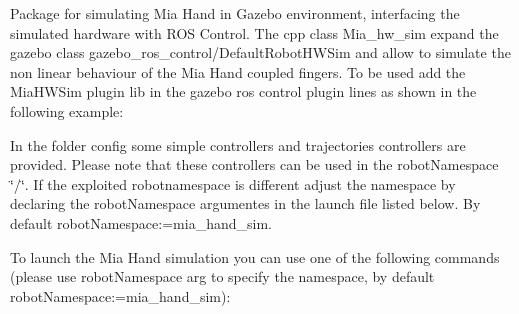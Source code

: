 Package for simulating Mia Hand in Gazebo environment, interfacing the simulated hardware with R\+OS Control. The cpp class Mia\+\_\+hw\+\_\+sim expand the gazebo class gazebo\+\_\+ros\+\_\+control/\+Default\+Robot\+H\+W\+Sim and allow to simulate the non linear behaviour of the Mia Hand coupled fingers. To be used add the Mia\+H\+W\+Sim plugin lib in the gazebo ros control plugin lines as shown in the following example\+:



In the folder config some simple controllers and trajectories controllers are provided. Please note that these controllers can be used in the robot\+Namespace \char`\"{}/\char`\"{}. If the exploited robotnamespace is different adjust the namespace by declaring the robot\+Namespace argumentes in the launch file listed below. By default robot\+Namespace\+:=mia\+\_\+hand\+\_\+sim.

To launch the Mia Hand simulation you can use one of the following commands (please use robot\+Namespace arg to specify the namespace, by default robot\+Namespace\+:=mia\+\_\+hand\+\_\+sim)\+:



